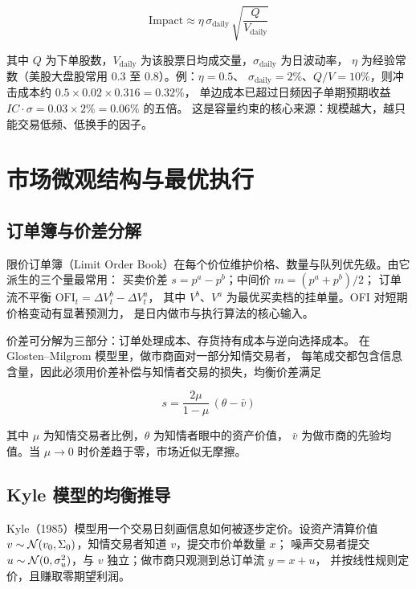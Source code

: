 \begin{equation}
  \text{Impact} \approx \eta\,\sigma_{\text{daily}}\,\sqrt{\frac{Q}{V_{\text{daily}}}}
  \label{eq:07-sqrtimpact}
\end{equation}

其中 $Q$ 为下单股数，$V_{\text{daily}}$ 为该股票日均成交量，$\sigma_{\text{daily}}$ 为日波动率，
$\eta$ 为经验常数（美股大盘股常用 $0.3$ 至 $0.8$）。例：$\eta = 0.5$、
$\sigma_{\text{daily}} = 2\%$、$Q/V = 10\%$，则冲击成本约 $0.5 \times 0.02 \times 0.316 = 0.32\%$，
单边成本已超过日频因子单期预期收益 $IC \cdot \sigma = 0.03 \times 2\% = 0.06\%$ 的五倍。
这是容量约束的核心来源：规模越大，越只能交易低频、低换手的因子。

\section{市场微观结构与最优执行}

\subsection{订单簿与价差分解}

限价订单簿（Limit Order Book）在每个价位维护价格、数量与队列优先级。由它派生的三个量最常用：
买卖价差 $s = p^{a} - p^{b}$；中间价 $m = (p^{a} + p^{b})/2$；
订单流不平衡 $\mathrm{OFI}_t = \Delta V^{b}_t - \Delta V^{a}_t$，
其中 $V^b$、$V^a$ 为最优买卖档的挂单量。OFI 对短期价格变动有显著预测力，
是日内做市与执行算法的核心输入。

价差可分解为三部分：订单处理成本、存货持有成本与逆向选择成本。
在 Glosten--Milgrom 模型里，做市商面对一部分知情交易者，
每笔成交都包含信息含量，因此必须用价差补偿与知情者交易的损失，均衡价差满足

\begin{equation}
  s = \frac{2\mu}{1-\mu}\,(\theta - \bar{v})
  \label{eq:07-gmspread}
\end{equation}

其中 $\mu$ 为知情交易者比例，$\theta$ 为知情者眼中的资产价值，
$\bar{v}$ 为做市商的先验均值。当 $\mu \to 0$ 时价差趋于零，市场近似无摩擦。

\subsection{Kyle 模型的均衡推导}

Kyle（1985）模型用一个交易日刻画信息如何被逐步定价。设资产清算价值
$v \sim \mathcal{N}(v_0, \Sigma_0)$，知情交易者知道 $v$，提交市价单数量 $x$；
噪声交易者提交 $u \sim \mathcal{N}(0, \sigma_u^2)$，与 $v$ 独立；做市商只观测到总订单流 $y = x + u$，
并按线性规则定价，且赚取零期望利润。

